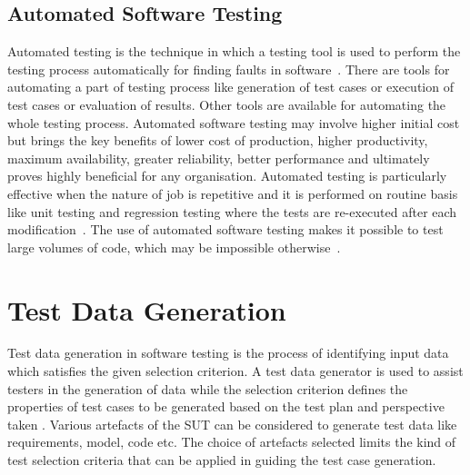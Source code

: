 \subsection{Automated Software Testing}
Automated testing is the technique in which a testing tool is used to perform the testing process automatically for finding faults in software~\cite{leitner2007reconciling}. There are tools for automating a part of testing process like generation of test cases or execution of test cases or evaluation of results. Other tools are available for automating the whole testing process. 
Automated software testing may involve higher initial cost but brings the key benefits of lower cost of production, higher productivity, maximum availability, greater reliability, better performance and ultimately proves highly beneficial for any organisation. Automated testing is particularly effective when the nature of job is repetitive and it is performed on routine basis like unit testing and regression testing where the tests are re-executed after each modification~\cite{huang2003automated}. The use of automated software testing makes it possible to test large volumes of code, which may be impossible otherwise~\cite{ramamoorthy1975testing}.

\section{Test Data Generation}
Test data generation in software testing is the process of identifying input data which satisfies the given selection criterion. A test data generator is used to assist testers in the generation of data while the selection criterion defines the properties of test cases to be generated based on the test plan and perspective taken \cite{korel1990automated}. Various artefacts of the SUT can be considered to generate test data like requirements, model, code etc. The choice of artefacts selected limits the kind of test selection criteria that can be applied in guiding the test case generation. 

